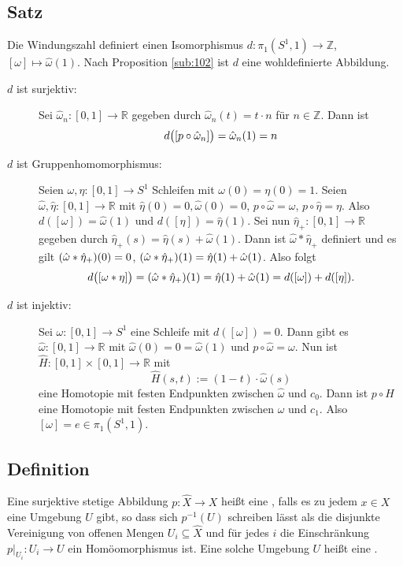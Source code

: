 
\subsection[Satz: Die Windungszahl definiert einen Isomorphismus $ \pi_1(S^1,1) \cong \mathds{Z}$]{Satz} %
\label{sub:104}
Die Windungszahl definiert einen Isomorphismus $d : \pi_1(S^1,1) \to \mathds{Z}$, $[\omega] \mapsto \hat{\omega}(1)$.
Nach Proposition \ref{sub:102} ist $d$ eine wohldefinierte Abbildung. 
\begin{description}
	\item[$d$ ist surjektiv:] Sei $\hat{\omega}_n : [0,1] \to \mathds{R}$ gegeben durch $\hat{\omega}_n (t) = t \cdot n$ für $n \in \mathds{Z}$. Dann ist 
	\[
		d \enbrace[\big]{ \benbrace*{p \circ  \hat{\omega}_n}} = \hat{\omega}_n(1) = n 
	\]
	\item[$d$ ist Gruppenhomomorphismus:] Seien $\omega, \eta : [0,1] \to S^1$ Schleifen mit 
	$\omega(0)= \eta(0) = 1$. Seien $\hat{\omega}, \hat{\eta} : [0,1] \to \mathds{R}$ mit 
	$\hat{\eta}(0)=0, \hat{\omega}(0)=0$, $p \circ  \hat{\omega} = \omega$, $p \circ \hat{\eta} = \eta$. Also $d( [\omega]) = \hat{\omega}(1)$ und 
	$d([\eta]) = \hat{\eta}(1)$. Sei nun $\hat{\eta}_+ : [0,1] \to \mathds{R}$ gegeben durch $\hat{\eta}_+ (s) = \hat{\eta}(s) + \hat{\omega}(1)$. 
	Dann ist $\hat{\omega} * \hat{\eta}_+$ definiert und es gilt $\enbrace*{\hat{\omega} * \hat{\eta}_+}(0) = 0 $, 
	$\enbrace*{\hat{\omega} * \hat{\eta}_+}(1) = \hat{\eta}(1) + \hat{\omega}(1)$. Also folgt
	\[
		d \enbrace[\big]{[\omega * \eta]} = \enbrace*{ \hat{\omega} * \hat{\eta}_+} (1) = \hat{\eta}(1) + \hat{\omega}(1) = d([\omega]) + d([\eta]).
	\]
	\item[$d$ ist injektiv:] Sei $\omega : [0,1] \to S^1$ eine Schleife mit $d([\omega]) = 0$. Dann gibt es $\hat{\omega} : [0,1] \to \mathds{R}$ mit 
	$\hat{\omega}(0)= 0 = \hat{\omega}(1)$ und $p \circ  \hat{\omega} = \omega$. Nun ist $\hat{H} : [0,1] \times [0,1] \to \mathds{R}$ mit 
	\[
		\hat{H} (s,t) := (1-t)\cdot  \hat{\omega}(s)
	\]
	eine Homotopie mit festen Endpunkten zwischen $\hat{\omega}$ und $c_0$. Dann ist $p \circ  H$ eine Homotopie mit festen Endpunkten zwischen $\omega$ und $c_1$.
	Also $[\omega] = e \in \pi_1(S^1,1)$. \bewende
\end{description}

\subsection[Definition: Überlagerung und elementare Umgebung]{Definition} %
\label{sub:105}
Eine surjektive stetige Abbildung $p : \hat{X} \to X$ heißt eine , falls es zu jedem $x \in X$ eine Umgebung $U$ gibt, so dass sich $p ^{-1}(U)$ 
schreiben lässt als die disjunkte Vereinigung von offenen Mengen $U_i  \subseteq \hat{X}$ und für jedes $i$ die Einschränkung $p\big|_{U_i} : U_i \to U$ ein 
Homöomorphismus ist. Eine solche Umgebung $U$ heißt eine . 

